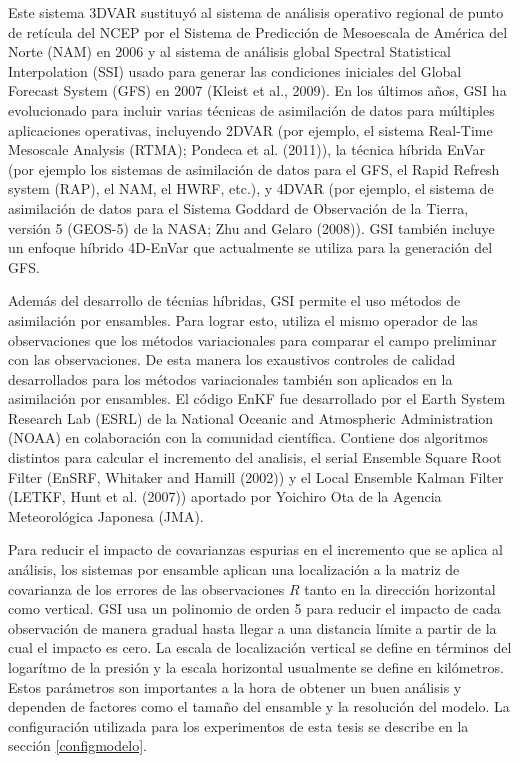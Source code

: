\documentclass[12pt,oneside]{reedthesis}
\begin{document}
Este sistema 3DVAR sustituyó al sistema de análisis operativo regional de punto de retícula del NCEP por el Sistema de Predicción de Mesoescala de América del Norte (NAM) en 2006 y al sistema de análisis global Spectral Statistical Interpolation (SSI) usado para generar las condiciones iniciales del Global Forecast System (GFS) en 2007 (Kleist et al., 2009).
En los últimos años, GSI ha evolucionado para incluir varias técnicas de asimilación de datos para múltiples aplicaciones operativas, incluyendo 2DVAR (por ejemplo, el sistema Real-Time Mesoscale Analysis (RTMA); Pondeca et al. (2011)), la técnica híbrida EnVar (por ejemplo los sistemas de asimilación de datos para el GFS, el Rapid Refresh system (RAP), el NAM, el HWRF, etc.), y 4DVAR (por ejemplo, el sistema de asimilación de datos para el Sistema Goddard de Observación de la Tierra, versión 5 (GEOS-5) de la NASA; Zhu and Gelaro (2008)).
GSI también incluye un enfoque híbrido 4D-EnVar que actualmente se utiliza para la generación del GFS.

Además del desarrollo de técnias híbridas, GSI permite el uso métodos de asimilación por ensambles. Para lograr esto, utiliza el mismo operador de las observaciones que los métodos variacionales para comparar el campo preliminar con las observaciones.
De esta manera los exaustivos controles de calidad desarrollados para los métodos variacionales también son aplicados en la asimilación por ensambles.
El código EnKF fue desarrollado por el Earth System Research Lab (ESRL) de la National Oceanic and Atmospheric Administration (NOAA) en colaboración con la comunidad científica.
Contiene dos algoritmos distintos para calcular el incremento del analisis, el serial Ensemble Square Root Filter (EnSRF, Whitaker and Hamill (2002)) y el Local Ensemble Kalman Filter (LETKF, Hunt et al. (2007)) aportado por Yoichiro Ota de la Agencia Meteorológica Japonesa (JMA).

Para reducir el impacto de covarianzas espurias en el incremento que se aplica al análisis, los sistemas por ensamble aplican una localización a la matriz de covarianza de los errores de las observaciones \(R\) tanto en la dirección horizontal como vertical.
GSI usa un polinomio de orden 5 para reducir el impacto de cada observación de manera gradual hasta llegar a una distancia límite a partir de la cual el impacto es cero. La escala de localización vertical se define en términos del logarítmo de la presión y la escala horizontal usualmente se define en kilómetros.
Estos parámetros son importantes a la hora de obtener un buen análisis y dependen de factores como el tamaño del ensamble y la resolución del modelo. La configuración utilizada para los experimentos de esta tesis se describe en la sección \ref{configmodelo}.
\end{document}
